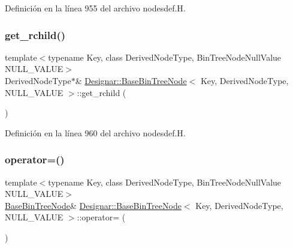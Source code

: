 Definición en la línea 955 del archivo nodesdef.\+H.

\mbox{\label{class_designar_1_1_base_bin_tree_node_a328220c701b0c58b024610cf8fb70850}} 
\subsubsection{\texorpdfstring{get\+\_\+rchild()}{get\_rchild()}}
{\footnotesize\ttfamily template$<$typename Key, class Derived\+Node\+Type, Bin\+Tree\+Node\+Null\+Value N\+U\+L\+L\+\_\+\+V\+A\+L\+UE$>$ \\
Derived\+Node\+Type$\ast$\& \hyperlink{class_designar_1_1_base_bin_tree_node}{Designar\+::\+Base\+Bin\+Tree\+Node}$<$ Key, Derived\+Node\+Type, N\+U\+L\+L\+\_\+\+V\+A\+L\+UE $>$\+::get\+\_\+rchild (\begin{DoxyParamCaption}{ }\end{DoxyParamCaption})\hspace{0.3cm}{\ttfamily [inline]}}



Definición en la línea 960 del archivo nodesdef.\+H.

\mbox{\label{class_designar_1_1_base_bin_tree_node_acde689f73c8d4fce33926e86882b0765}} 
\subsubsection{\texorpdfstring{operator=()}{operator=()}}
{\footnotesize\ttfamily template$<$typename Key, class Derived\+Node\+Type, Bin\+Tree\+Node\+Null\+Value N\+U\+L\+L\+\_\+\+V\+A\+L\+UE$>$ \\
\hyperlink{class_designar_1_1_base_bin_tree_node}{Base\+Bin\+Tree\+Node}\& \hyperlink{class_designar_1_1_base_bin_tree_node}{Designar\+::\+Base\+Bin\+Tree\+Node}$<$ Key, Derived\+Node\+Type, N\+U\+L\+L\+\_\+\+V\+A\+L\+UE $>$\+::operator= (\begin{DoxyParamCaption}\item[{const \hyperlink{class_designar_1_1_base_bin_tree_node}{Base\+Bin\+Tree\+Node}$<$ Key, Derived\+Node\+Type, N\+U\+L\+L\+\_\+\+V\+A\+L\+UE $>$ \&}]{ }\end{DoxyParamCaption})\hspace{0.3cm}{\ttfamily [delete]}}



